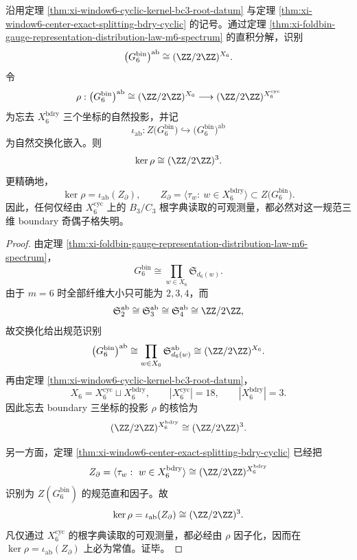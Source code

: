\begin{theorem}\label{thm:xi-time-part69c-window6-root-boundary-blind-codim3}
沿用定理 \ref{thm:xi-window6-cyclic-kernel-bc3-root-datum} 与定理 \ref{thm:xi-window6-center-exact-splitting-bdry-cyclic} 的记号。通过定理 \ref{thm:xi-foldbin-gauge-representation-distribution-law-m6-spectrum} 的直积分解，识别
\[
\bigl(G_6^{\mathrm{bin}}\bigr)^{\mathrm{ab}}
\cong
(\ZZ/2\ZZ)^{X_6}.
\]
令
\[
\rho:
\bigl(G_6^{\mathrm{bin}}\bigr)^{\mathrm{ab}}
\cong
(\ZZ/2\ZZ)^{X_6}
\longrightarrow
(\ZZ/2\ZZ)^{X_6^{\mathrm{cyc}}}
\]
为忘去 \(X_6^{\mathrm{bdry}}\) 三个坐标的自然投影，并记
\[
\iota_{\mathrm{ab}}:
Z\!\bigl(G_6^{\mathrm{bin}}\bigr)
\hookrightarrow
\bigl(G_6^{\mathrm{bin}}\bigr)^{\mathrm{ab}}
\]
为自然交换化嵌入。则
\[
\ker\rho
\cong
(\ZZ/2\ZZ)^3.
\]
更精确地，
\[
\ker\rho
=
\iota_{\mathrm{ab}}(Z_{\partial}),
\qquad
Z_{\partial}
=
\langle \tau_w:\ w\in X_6^{\mathrm{bdry}}\rangle
\subset Z\!\bigl(G_6^{\mathrm{bin}}\bigr).
\]
因此，任何仅经由 \(X_6^{\mathrm{cyc}}\) 上的 \(B_3/C_3\) 根字典读取的可观测量，都必然对这一规范三维 boundary 奇偶子格失明。
\end{theorem}
\begin{proof}
由定理 \ref{thm:xi-foldbin-gauge-representation-distribution-law-m6-spectrum}，
\[
G_6^{\mathrm{bin}}
\cong
\prod_{w\in X_6}\mathfrak S_{d_6(w)}.
\]
由于 \(m=6\) 时全部纤维大小只可能为 \(2,3,4\)，而
\[
\mathfrak S_2^{\mathrm{ab}}\cong
\mathfrak S_3^{\mathrm{ab}}\cong
\mathfrak S_4^{\mathrm{ab}}
\cong
\ZZ/2\ZZ,
\]
故交换化给出规范识别
\[
\bigl(G_6^{\mathrm{bin}}\bigr)^{\mathrm{ab}}
\cong
\prod_{w\in X_6}\mathfrak S_{d_6(w)}^{\mathrm{ab}}
\cong
(\ZZ/2\ZZ)^{X_6}.
\]
再由定理 \ref{thm:xi-window6-cyclic-kernel-bc3-root-datum}，
\[
X_6=X_6^{\mathrm{cyc}}\sqcup X_6^{\mathrm{bdry}},
\qquad
|X_6^{\mathrm{cyc}}|=18,
\qquad
|X_6^{\mathrm{bdry}}|=3.
\]
因此忘去 boundary 三坐标的投影 \(\rho\) 的核恰为
\[
(\ZZ/2\ZZ)^{X_6^{\mathrm{bdry}}}
\cong
(\ZZ/2\ZZ)^3.
\]

另一方面，定理 \ref{thm:xi-window6-center-exact-splitting-bdry-cyclic} 已经把
\[
Z_{\partial}
=
\langle \tau_w:\ w\in X_6^{\mathrm{bdry}}\rangle
\cong
(\ZZ/2\ZZ)^{X_6^{\mathrm{bdry}}}
\]
识别为 \(Z(G_6^{\mathrm{bin}})\) 的规范直和因子。故
\[
\ker\rho=\iota_{\mathrm{ab}}(Z_{\partial})\cong (\ZZ/2\ZZ)^3.
\]
凡仅通过 \(X_6^{\mathrm{cyc}}\) 的根字典读取的可观测量，都必经由 \(\rho\) 因子化，因而在 \(\ker\rho=\iota_{\mathrm{ab}}(Z_{\partial})\) 上必为常值。证毕。
\end{proof}

